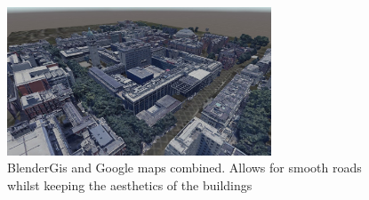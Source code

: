 \begin{figure}[H]
    \centering
    \includegraphics[width=0.7\textwidth]{06_Implementation/00_Maps/Images/CombinedCropped.JPG}
    \caption[Combined BlenderGis and Google Maps]{BlenderGis and Google maps combined. Allows for smooth roads whilst keeping the aesthetics of the buildings}
    \label{maps:figure:combined}
\end{figure}
